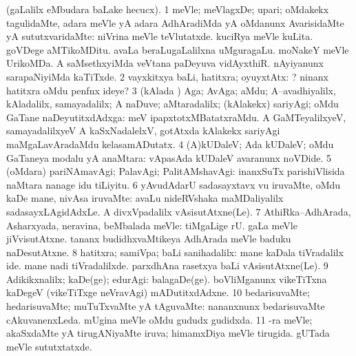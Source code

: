 \bentry
{}
\gl{\upa}
\bmng
(\pagu gaLalilx  eMbudara baLake hecucx). 
\bnum
\num{1} meVle; meVlagxDe; upari; oMdakekx tagulidaMte, adara meVle yA adara AdhAradiMda yA oMdanunx AvarisidaMte yA sututxvaridaMte:  niVrina meVle teVlutatxde.  kuciRya meVle kuLita.  goVDege aMTikoMDitu.  avaLa beraLugaLalilxna uMguragaLu.  moNakeY meVle UrikoMDa.  A saMsethxyiMda veVtana paDeyuva vidAyxthiR.  nAyiyanunx sarapaNiyiMda kaTiTxde. 
\num{2} vayxkitxya baLi, hatitxra; oyuyxtAtx: ? ninanx hatitxra oMdu penfnx ideye? 
\num{3} (kAlada \vi) Aga; AvAga; aMdu; A--avadhiyalilx, kAladalilx, samayadalilx; A naDuve; aMtaradalilx; (kAlakekx) sariyAgi; oMdu GaTane naDeyutitxdAdxga:  meV ipapxtotxMBatatxraMdu.  A GaMTeyalilxyeV, samayadalilxyeV  A kaSxNadalelxV,  gotAtxda kAlakekx sariyAgi  maMgaLavAradaMdu kelasamADutatx. 
\num{4} (A)kUDaleV; Ada kUDaleV; oMdu GaTaneya modalu yA anaMtara:  vApasAda kUDaleV avaranunx noVDide. 
\num{5} (oMdara) pariNAmavAgi; PalavAgi; PalitAMshavAgi:  inanxSuTx parishiVlisida naMtara nanage idu tiLiyitu. 
\num{6} yAvudAdarU sadasayxtavx \mo vu iruvaMte, oMdu kaDe mane, nivAsa iruvaMte:  avaLu nideRVshaka maMDaliyalilx sadasayxLAgidAdxLe.  A divxVpadalilx vAsisutAtxne(Le). 
\num{7} AthiRka--AdhArada, Asharxyada, neravina, beMbalada meVle:  tiMgaLige  rU. gaLa meVle jiVvisutAtxne.  tananx budidhxvaMtikeya AdhArada meVle baduku naDesutAtxne. 
\num{8} hatitxra; samiVpa; baLi sanihadalilx:  mane kaDala tiVradalilx ide.  mane nadi tiVradalilxde.  parxdhAna rasetxya baLi vAsisutAtxne(Le). 
\num{9} Adikikxnalilx; kaDe(ge); edurAgi:  balagaDe(ge).  boVliMganunx vikeTiTxna kaDegeV (vikeTiTxge neVravAgi) mADutitxdAdxne. 
\num{10} bedarisuvaMte; hedarisuvaMte; muTuTxvaMte yA tAguvaMte:  nananxnunx bedarisuvaMte cAkuvanenxLeda.  mUgina meVle oMdu gududx gudidxda. 
\num{11} -ra meVle; akaSxdaMte yA tirugANiyaMte iruva;  himamxDiya meVle tirugida.  gUTada meVle sututxtatxde. 
